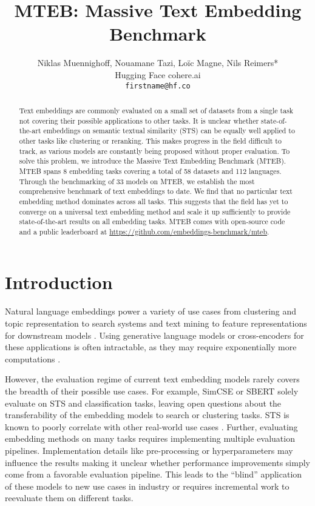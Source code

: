 \documentclass[11pt]{article}
\title{MTEB: Massive Text Embedding Benchmark}
\author{Niklas Muennighoff, Nouamane Tazi, Loïc Magne, Nils Reimers* \\
  Hugging Face \quad cohere.ai \\
  {\tt firstname@hf.co} \quad {\tt info@nils-reimers.de}\\
}
\begin{document}
\maketitle
\begingroup\def\thefootnote{*}\endgroup
\begin{abstract}

Text embeddings are commonly evaluated on a small set of datasets from a single task not covering their possible applications to other tasks. It is unclear whether state-of-the-art embeddings on semantic textual similarity (STS) can be equally well applied to other tasks like clustering or reranking. This makes progress in the field difficult to track, as various models are constantly being proposed without proper evaluation. To solve this problem, we introduce the Massive Text Embedding Benchmark (MTEB). MTEB spans 8 embedding tasks covering a total of 58 datasets and 112 languages. Through the benchmarking of 33 models on MTEB, we establish the most comprehensive benchmark of text embeddings to date. We find that no particular text embedding method dominates across all tasks. This suggests that the field has yet to converge on a universal text embedding method and scale it up sufficiently to provide state-of-the-art results on all embedding tasks. MTEB comes with open-source code and a public leaderboard at
\url{https://github.com/embeddings-benchmark/mteb}.

\end{abstract}

\section{Introduction}

Natural language embeddings power a variety of use cases from clustering and topic representation \cite{aggarwal2012survey, angelov2020top2vec} to search systems and text mining \cite{huang2020embedding, zhu2021bing, nayak2021google} to feature representations for downstream models \cite{saharia2022photorealistic, borgeaud2022improving}. Using generative language models or cross-encoders for these applications is often intractable, as they may require exponentially more computations \cite{reimers2019sentence}.

However, the evaluation regime of current text embedding models rarely covers the breadth of their possible use cases. For example, SimCSE \cite{gao2021simcse} or SBERT \cite{reimers2019sentence} solely evaluate on STS and classification tasks, leaving open questions about the transferability of the embedding models to search or clustering tasks. STS is known to poorly correlate with other real-world use cases \cite{neelakantan2022text, wang2021tsdae}. Further, evaluating embedding methods on many tasks requires implementing multiple evaluation pipelines. Implementation details like pre-processing or hyperparameters may influence the results making it unclear whether performance improvements simply come from a favorable evaluation pipeline. This leads to the ``blind'' application of these models to new use cases in industry or requires incremental work to reevaluate them on different tasks.
\end{document}
